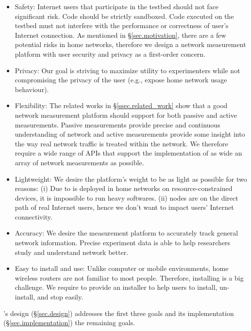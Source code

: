 \begin{itemize}
\item Safety: Internet users that participate in the testbed should not face significant risk. Code should be strictly sandboxed. Code executed on the testbed must not interfere with the performance or correctness of user's Internet connection. As mentioned in \S{\ref{sec.motivation}}, there are a few potential risks in home networks, therefore we design a network measurement platform with user security and privacy as a first-order concern.

\item Privacy: Our goal is striving to maximize utility to experimenters while not compromising the privacy of the user (e.g., expose home network usage behaviour).

\item Flexibility: The related works in \S{\ref{ssec.related_work}} show that a good network measurement platform should support for both passive and active measurements. Passive measurements provide precise and continuous understanding of network and active measurements provide some insight into the way real network traffic is treated within the network. We therefore require a wide range of APIs that support the implementation of as wide an array of network measurements as possible.

\item Lightweight: We desire the platform's weight to be as light as possible for two reasons: (i) Due to \sysname is deployed in home networks on resource-constrained devices, it is impossible to run heavy softwares. (ii) \sysname nodes are on the direct path of real Internet users, hence we don't want to impact users' Internet connectivity.

\item Accuracy: We desire the measurement platform to accurately track 
general network information. Precise experiment data is able to help researchers study and understand network better.

\item Easy to install and use: Unlike computer or mobile environments, home wireless routers are not familiar to most people. Therefore, installing is a big challenge. We require to provide an installer to help users to install, un-install, and stop easily.
\end{itemize}

\sysname's design (\S\ref{sec.design}) addresses the first three goals and its implementation (\S\ref{sec.implementation}) the remaining goals.
